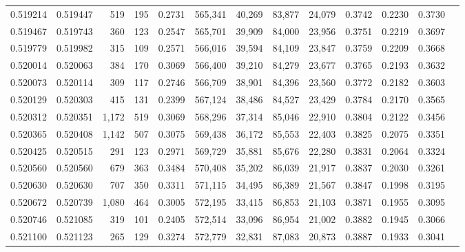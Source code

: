 \begin{tabular}{rrrrrrrrrrrrr}
0.519214 & 0.519447 &   519 &   195 &                                     0.2731 & 565,341 &  40,269 &  83,877 &  24,079 & 0.3742 & 0.2230 & 0.3730 \\
0.519467 & 0.519743 &   360 &   123 &                                     0.2547 & 565,701 &  39,909 &  84,000 &  23,956 & 0.3751 & 0.2219 & 0.3697 \\
0.519779 & 0.519982 &   315 &   109 &                                     0.2571 & 566,016 &  39,594 &  84,109 &  23,847 & 0.3759 & 0.2209 & 0.3668 \\
0.520014 & 0.520063 &   384 &   170 &                                     0.3069 & 566,400 &  39,210 &  84,279 &  23,677 & 0.3765 & 0.2193 & 0.3632 \\
0.520073 & 0.520114 &   309 &   117 &                                     0.2746 & 566,709 &  38,901 &  84,396 &  23,560 & 0.3772 & 0.2182 & 0.3603 \\
0.520129 & 0.520303 &   415 &   131 &                                     0.2399 & 567,124 &  38,486 &  84,527 &  23,429 & 0.3784 & 0.2170 & 0.3565 \\
0.520312 & 0.520351 & 1,172 &   519 &                                     0.3069 & 568,296 &  37,314 &  85,046 &  22,910 & 0.3804 & 0.2122 & 0.3456 \\
0.520365 & 0.520408 & 1,142 &   507 &                                     0.3075 & 569,438 &  36,172 &  85,553 &  22,403 & 0.3825 & 0.2075 & 0.3351 \\
0.520425 & 0.520515 &   291 &   123 &                                     0.2971 & 569,729 &  35,881 &  85,676 &  22,280 & 0.3831 & 0.2064 & 0.3324 \\
0.520560 & 0.520560 &   679 &   363 &                                     0.3484 & 570,408 &  35,202 &  86,039 &  21,917 & 0.3837 & 0.2030 & 0.3261 \\
0.520630 & 0.520630 &   707 &   350 &                                     0.3311 & 571,115 &  34,495 &  86,389 &  21,567 & 0.3847 & 0.1998 & 0.3195 \\
0.520672 & 0.520739 & 1,080 &   464 &                                     0.3005 & 572,195 &  33,415 &  86,853 &  21,103 & 0.3871 & 0.1955 & 0.3095 \\
0.520746 & 0.521085 &   319 &   101 &                                     0.2405 & 572,514 &  33,096 &  86,954 &  21,002 & 0.3882 & 0.1945 & 0.3066 \\
0.521100 & 0.521123 &   265 &   129 &                                     0.3274 & 572,779 &  32,831 &  87,083 &  20,873 & 0.3887 & 0.1933 & 0.3041 \\

\end{tabular}

